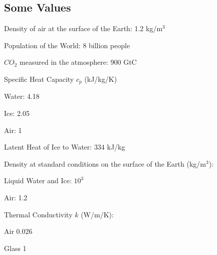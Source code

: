 \documentclass[11pt]{article}
\begin{document}
\subsection{Some Values}
\bei
\item Density of air at the surface of the Earth: 1.2 kg/m$^3$
\item Population of the World: 8 billion people
\item $CO_2$ measured in the atmosphere: 900 GtC 
\item Specific Heat Capacity $c_p$ (kJ/kg/K)
\bee
\item Water: 4.18
\item Ice: 2.05
\item Air: 1
\eee
\item Latent Heat of Ice to Water: $334$ kJ/kg
\item Density at standard conditions on the surface of the Earth (kg/m$^3$):
\bee 
\item Liquid Water and Ice: $10^3$ 
\item Air: 1.2 
\eee
\item Thermal Conductivity $k$ (W/m/K):
\bee
\item Air 0.026
\item Glass 1
\eee
\eei
\end{document}
